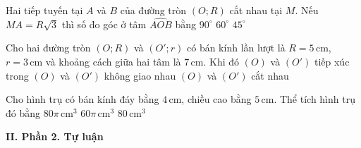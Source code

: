 \begin{ex}%
Hai tiếp tuyến tại $A$ và $B$ của đường tròn $(O;R)$ cắt nhau tại $M$. Nếu $MA = R \sqrt{3}$ thì số đo góc ở tâm $\widehat{AOB}$ bằng
{$90^\circ$}
{$60^\circ$}
{$45^\circ$}
\end{ex}

\begin{ex}%
Cho hai đường tròn $(O;R)$ và $(O';r)$ có bán kính lần lượt là $R=5\,\mathrm{cm}$, $r=3\,\mathrm{cm}$ và khoảng cách giữa hai tâm là $7\,\mathrm{cm}$. Khi đó
{$(O)$ và $(O')$ tiếp xúc trong}
{$(O)$ và $(O')$ không giao nhau}
{\True $(O)$ và $(O')$ cắt nhau} 
\end{ex}

\begin{ex}%
Cho hình trụ có bán kính đáy bằng $4\,\mathrm{cm}$, chiều cao bằng $5\,\mathrm{cm}$. Thể tích hình trụ đó bằng
{\True $80\pi\,\mathrm{cm^3}$}
{$60\pi\,\mathrm{cm^3}$}
{$80\,\mathrm{cm^3}$}
\end{ex}

\textbf{II. Phần 2. Tự luận}

